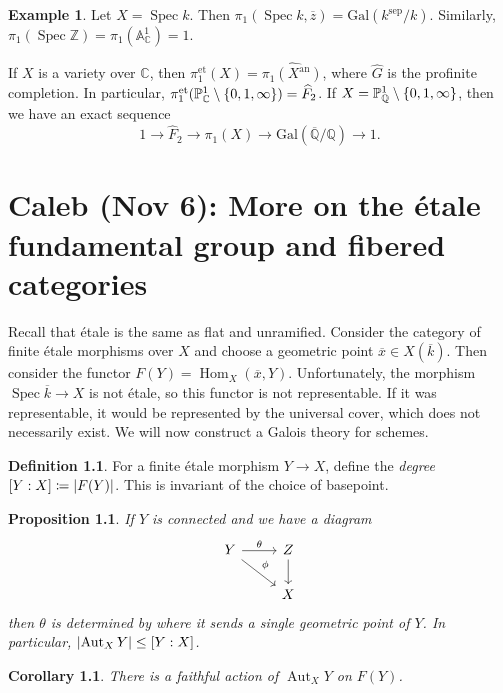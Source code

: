 \documentclass[leqno, openany]{memoir}
\newtheorem{cor}[thm]{Corollary}
\newtheorem{prop}[thm]{Proposition}
\theoremstyle{definition}
\newtheorem{defn}[thm]{Definition}
\newtheorem{exm}[thm]{Example}
\theoremstyle{remark}
\theoremstyle{plain}
\theoremstyle{definition}
\theoremstyle{remark}
\newcommand{\A}{\mathbb{A}}
\newcommand{\C}{\mathbb{C}}
\newcommand{\Z}{\mathbb{Z}}
\newcommand{\Q}{\mathbb{Q}}
\renewcommand{\P}{\mathbb{P}}
\newcommand{\mr}[1]{\mathrm{#1}}
\newcommand{\ol}[1]{\overline{#1}}
\newcommand{\wh}[1]{\widehat{#1}}
\DeclareMathOperator{\Hom}{Hom}
\DeclareMathOperator{\Aut}{Aut}
\DeclareMathOperator{\Spec}{Spec}
\begin{document}
\begin{exm} Let $X = \Spec k$. Then $\pi_1(\Spec k, \ol{z}) =
    \mr{Gal}(k^{\mr{sep}} / k)$. Similarly, $\pi_1(\Spec \Z) = \pi_1(\A^1_{\C})
    = 1$.

    If $X$ is a variety over $\C$, then $\pi_1^{\mr{et}}(X) =
    \wh{\pi_1(X^{\mr{an}})}$, where $\wh{G}$ is the profinite completion. In
    particular, $\pi_1^{\mr{et}}(\P^1_{\C} \setminus \qty{0,1,\infty}) =
    \wh{F}_2$. If $X = \P^1_{\Q} \setminus \qty{0,1, \infty}$, then we have an
    exact sequence \[ 1 \to \wh{F}_2 \to \pi_1(X) \to \mr{Gal}(\ol{\Q}/\Q) \to
    1. \] \end{exm}

\chapter{Caleb (Nov 6): More on the \'etale fundamental group and fibered
categories}%
\label{cha:caleb_nov_6_more_on_the_'etale_fundamental_group_and_fibered_categories}

Recall that \'etale is the same as flat and unramified. Consider the category
of finite \'etale morphisms over $X$ and choose a geometric point $\ol{x} \in
X(\ol{k})$. Then consider the functor $F(Y) = \Hom_X(\ol{x}, Y)$.
Unfortunately, the morphism $\Spec \ol{k} \to X$ is not \'etale, so this
functor is not representable. If it was representable, it would be represented
by the universal cover, which does not necessarily exist. We will now construct
a Galois theory for schemes.

\begin{defn} For a finite \'etale morphism $Y \to X$, define the
\textit{degree} $[Y:X] \coloneqq \abs{F(Y)}$. This is invariant of the choice
of basepoint.  \end{defn}

\begin{prop} If $Y$ is connected and we have a diagram \begin{equation*}
    \begin{tikzcd} Y \arrow{r}{\theta} \arrow{dr}{\phi} & Z \arrow{d} \\ & X
    \end{tikzcd} \end{equation*} then $\theta$ is determined by where it sends
    a single geometric point of $Y$. In particular, $\abs{\Aut_X Y} \leq
    [Y:X]$.  \end{prop}

\begin{cor} There is a faithful action of $\Aut_X Y$ on $F(Y)$.  \end{cor}
\end{document}
